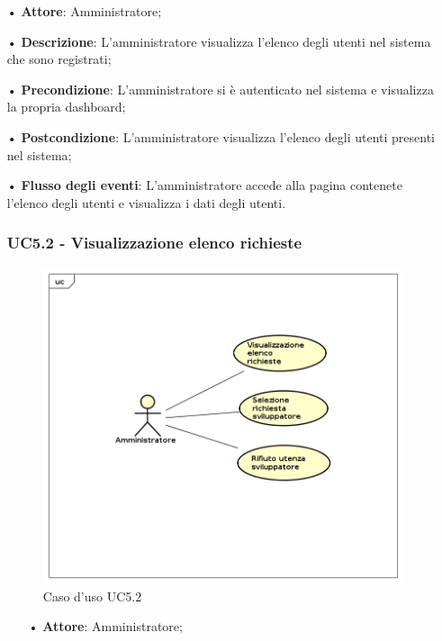 \begin{itemize}
\item[•] \textbf{Attore}: Amministratore;

\item[•] \textbf{Descrizione}: L'amministratore visualizza l'elenco degli utenti nel sistema che sono registrati;

\item[•] \textbf{Precondizione}: L'amministratore si è autenticato nel sistema e visualizza la propria dashboard;

\item[•] \textbf{Postcondizione}: L'amministratore visualizza l'elenco degli utenti presenti nel sistema;

\item[•] \textbf{Flusso degli eventi}: L'amministratore accede alla pagina contenete l'elenco degli utenti e visualizza i dati degli utenti. 


\subsubsection{UC5.2 - Visualizzazione elenco richieste}

\begin{figure}[H]
\centering
\includegraphics[width=17cm]{img/UC52.png} 
\caption{Caso d'uso UC5.2}
\end{figure}


\begin{itemize}
\item[•] \textbf{Attore}: Amministratore;


\end{itemize}
\end{itemize}
